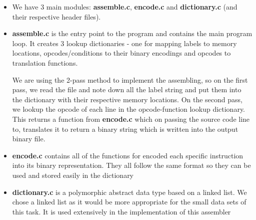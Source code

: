 \documentclass[11pt]{article}
\begin{document}
\begin{itemize}

\item 
We have 3 main modules: \textbf{assemble.c}, \textbf{encode.c} and \textbf{dictionary.c} (and their respective header files).

\item
\textbf{assemble.c} is the entry point to the program and contains the main program loop. It creates 3 lookup dictionaries - one for mapping labels to memory locations, opcodes/conditions to their binary encodings and opcodes to translation functions. 

We are using the 2-pass method to implement the assembling, so on the first pass, we read the file and note down all the label string and put them into the dictionary with their respective memory locations. On the second pass, we lookup the opcode of each line in the opcode-function lookup dictionary. This returns a function from \textbf{encode.c} which on passing the source code line to, translates it to return a binary string which is written into the output binary file.

\item
\textbf{encode.c} contains all of the functions for encoded each specific instruction into its binary representation. They all follow the same format so they can be used and stored easily in the dictionary

\item
\textbf{dictionary.c} is a polymorphic abstract data type based on a linked list. We chose a linked list as it would be more appropriate for the small data sets of this task. It is used extensively in the implementation of this assembler

\end{itemize}
\end{document}

